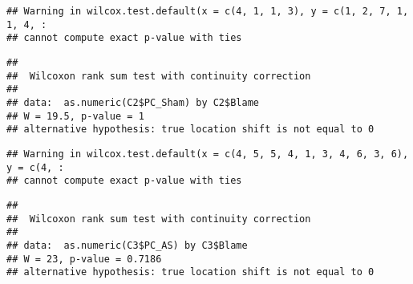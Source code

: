 \documentclass[
]{article}
\newenvironment{Shaded}{\begin{snugshade}}{\end{snugshade}}
\newcommand{\DecValTok}[1]{\textcolor[rgb]{0.00,0.00,0.81}{#1}}
\newcommand{\KeywordTok}[1]{\textcolor[rgb]{0.13,0.29,0.53}{\textbf{#1}}}
\newcommand{\NormalTok}[1]{#1}
\newcommand{\OperatorTok}[1]{\textcolor[rgb]{0.81,0.36,0.00}{\textbf{#1}}}
\newcommand{\StringTok}[1]{\textcolor[rgb]{0.31,0.60,0.02}{#1}}
\begin{document}
\begin{Shaded}
\begin{Highlighting}[]
{{{\NormalTok{C4<-Blame_PC_PAM[,}\KeywordTok{c}\NormalTok{(}\DecValTok{2}\NormalTok{,}\DecValTok{3}\NormalTok{,}\DecValTok{4}\NormalTok{)]}\OperatorTok{%>%}\KeywordTok{filter}\NormalTok{(}\OperatorTok{!}\NormalTok{Blame}\OperatorTok{==}\StringTok{"neutral"} \OperatorTok{&}\StringTok{ }\NormalTok{Condition}\OperatorTok{==}\StringTok{"4"}\NormalTok{)}
\NormalTok{C4 <-}\StringTok{ }\NormalTok{C4 }\OperatorTok{%>%}\StringTok{ }\KeywordTok{rename}\NormalTok{(}\StringTok{"PC_AF"}\NormalTok{ =}\StringTok{ "PC_Sham"}\NormalTok{)}
\KeywordTok{wilcox.test}\NormalTok{(}\KeywordTok{as.numeric}\NormalTok{(C2}\OperatorTok{$}\NormalTok{PC_Sham) }\OperatorTok{~}\StringTok{ }\NormalTok{C2}\OperatorTok{$}\NormalTok{Blame)}
\end{Highlighting}
\end{Shaded}

\begin{verbatim}
## Warning in wilcox.test.default(x = c(4, 1, 1, 3), y = c(1, 2, 7, 1, 1, 4, :
## cannot compute exact p-value with ties
\end{verbatim}

\begin{verbatim}
## 
##  Wilcoxon rank sum test with continuity correction
## 
## data:  as.numeric(C2$PC_Sham) by C2$Blame
## W = 19.5, p-value = 1
## alternative hypothesis: true location shift is not equal to 0
\end{verbatim}

\begin{Shaded}
\end{Shaded}

\begin{verbatim}
## Warning in wilcox.test.default(x = c(4, 5, 5, 4, 1, 3, 4, 6, 3, 6), y = c(4, :
## cannot compute exact p-value with ties
\end{verbatim}

\begin{verbatim}
## 
##  Wilcoxon rank sum test with continuity correction
## 
## data:  as.numeric(C3$PC_AS) by C3$Blame
## W = 23, p-value = 0.7186
## alternative hypothesis: true location shift is not equal to 0
\end{verbatim}

\begin{Shaded}
\end{Shaded}
\end{document}
